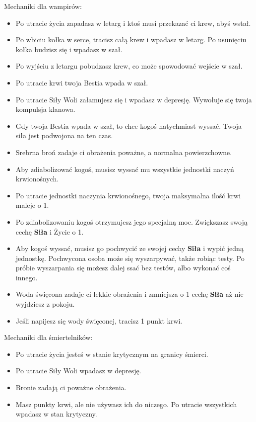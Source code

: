 	Mechaniki dla wampirów:
	\begin{itemize}
		\item Po utracie życia zapadasz w letarg i ktoś musi przekazać ci krew, abyś wstał.
		\item Po wbiciu kołka w serce, tracisz całą krew i wpadasz w letarg. Po usunięciu kołka budzisz się i wpadasz w szał.
		\item Po wyjściu z letargu pobudzasz krew, co może spowodować wejście w szał.
		\item Po utracie krwi twoja Bestia wpada w szał.
		\item Po utracie Siły Woli załamujesz się i wpadasz w depresję. Wywołuje się twoja kompulsja klanowa.
		\item Gdy twoja Bestia wpada w szał, to chce kogoś natychmiast wyssać. Twoja siła jest podwojona na ten czas.
		\item Srebrna broń zadaje ci obrażenia poważne, a normalna powierzchowne.
		\item Aby zdiabolizować kogoś, musisz wyssać mu wszystkie jednostki naczyń krwionośnych.
		\item Po utracie jednostki naczynia krwionośnego, twoja maksymalna ilość krwi maleje o 1.
		\item Po zdiabolizowaniu kogoś otrzymujesz jego specjalną moc. Zwiększasz swoją cechę \textbf{Siła} i Życie o 1.
		\item Aby kogoś wyssać, musisz go pochwycić ze swojej cechy \textbf{Siła} i wypić jedną jednostkę. Pochwycona osoba może się wyszarpywać, także robiąc testy. Po próbie wyszarpania się możesz dalej ssać bez testów, albo wykonać coś innego.
		\item Woda święcona zadaje ci lekkie obrażenia i zmniejsza o 1 cechę \textbf{Siła} aż nie wyjdziesz z pokoju.
		\item Jeśli napijesz się wody święconej, tracisz 1 punkt krwi.
	\end{itemize}

	Mechaniki dla śmiertelników:
	\begin{itemize}
		\item Po utracie życia jesteś w stanie krytycznym na granicy śmierci.
		\item Po utracie Siły Woli wpadasz w depresję.
		\item Bronie zadają ci poważne obrażenia.
		\item Masz punkty krwi, ale nie używasz ich do niczego. Po utracie wszystkich wpadasz w stan krytyczny.
	\end{itemize}

